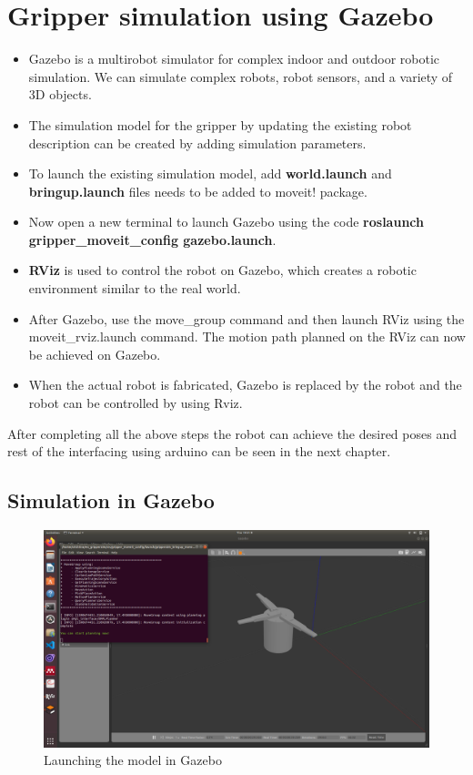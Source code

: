 \documentclass[a4paper,12pt,one side]{report}%
\begin{document}
\section{ Gripper simulation using Gazebo}
\begin{itemize}
\item Gazebo is a multirobot simulator for complex indoor and outdoor robotic simulation. We can simulate complex robots, robot sensors, and a variety of 3D objects.
    \item The simulation model for the gripper by updating the existing robot description can be created by adding simulation parameters. 
    \item To launch the existing simulation model,  add \textbf{world.launch} and  \textbf{bringup.launch} files needs to be added to moveit! package.
    \item Now open a new terminal to launch Gazebo using the code \textbf{roslaunch gripper\_moveit\_config gazebo.launch}.
    \item \textbf{RViz} is used to control the robot on Gazebo, which creates a robotic environment similar to the real world. 
    \item After Gazebo, use the move\_group command and then launch RViz using the moveit\_rviz.launch command. The motion path planned on the RViz can now be achieved on  Gazebo.
    \item When the actual robot is fabricated, Gazebo is replaced by the robot and the robot can be controlled by using Rviz.
\end{itemize}

\par After completing all the above steps the robot can achieve the desired poses and rest of the interfacing using arduino can be seen in the next chapter. 



\subsection{Simulation in Gazebo}


\begin{figure}[!h]
\centering
\includegraphics[scale=.2]{gripper_images/gripper_gazebo.png}
\caption{ Launching the model in Gazebo}
\label{joint_State}
\end{figure}
\end{document}
